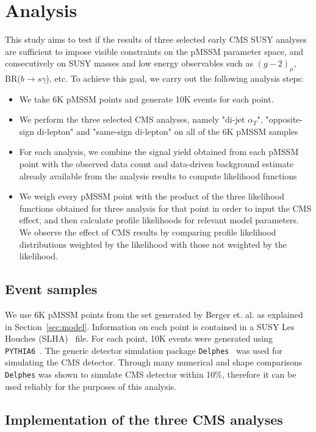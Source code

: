 \section{Analysis}

This study aims to test if the results of three selected early CMS SUSY analyses are sufficient to impose visible constraints on the pMSSM parameter space, and consecutively on SUSY masses and low energy observables such as $(g-2)_\mu$, BR($b\rightarrow s\gamma$), etc.  To achieve this goal, we carry out the following analysis steps:
\begin{itemize}
\item We take 6K pMSSM points and generate 10K events for each point.
\item We perform the three selected CMS analyses, namely "di-jet $\alpha_T$", "opposite-sign di-lepton" and "same-sign di-lepton" on all of the 6K pMSSM samples
\item For each analysis, we combine the signal yield obtained from each pMSSM point with the observed data count and data-driven background estimate already available from the analysis results to compute likelihood functions
\item We weigh every pMSSM point with the product of the three likelihood functions obtained for three analysis for that point in order to input the CMS effect, and then calculate profile likelihoods for relevant model parameters.  We observe the effect of CMS results by comparing profile likelihood distributions weighted by the likelihood with those not weighted by the likelihood. 
\end{itemize}

\subsection{Event samples}

We use 6K pMSSM points from the set generated by Berger et. al. as explained in Section~\ref{sec:model}.  Information on each point is contained in a SUSY Les Houches (SLHA)~\cite{Skands:2003cj} file.  For each point, 10K events were generated using {\tt PYTHIA6}~\cite{Sjostrand:2006za}.  The generic detector simulation package {\tt Delphes}~\cite{Ovyn:2009tx} was used for simulating the CMS detector.  Through many numerical and shape comparisons {\tt Delphes} was shown to simulate CMS detector within 10\%, therefore it can be used reliably for the purposes of this analysis.

\subsection{Implementation of the three CMS analyses}

